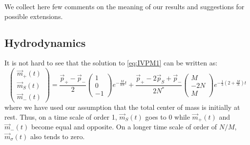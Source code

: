 \documentclass{article}
\begin{document}
We collect here few comments on the meaning of our results and suggestions for possible extensions.

\subsection{Hydrodynamics}\label{subsec:hidro}


It is not hard to see that the solution to \eqref{eq:IVPM1} can be written as:
%
\begin{equation}\label{eq:IVPsol}
	\begin{pmatrix}
		\vec m_+(t) \\ \vec m_S(t) \\ \vec m_-(t)
	\end{pmatrix}=
\frac{\vec p_+-\vec p_-}2\begin{pmatrix}
	1 \\ 0 \\ -1
\end{pmatrix} e^{-\frac M{3N} t}+
\frac{\vec p_+-2\vec p_S+\vec p_-}{2N^*}\begin{pmatrix}
	M \\ -2N \\ M
\end{pmatrix}e^{-\frac 13\left(2+\frac MN\right)t}
\end{equation}
%
where we have used our assumption that the total center of mass is initially at rest. Thus, on a time scale of order 1,
$\vec m_S(t)$ goes to 0 while $\vec m_+(t)$ and $\vec m_-(t)$ become equal and opposite. On a longer time scale of order
of $N/M$,  $\vec m_\sigma(t)$ also tends to zero.
\end{document}
